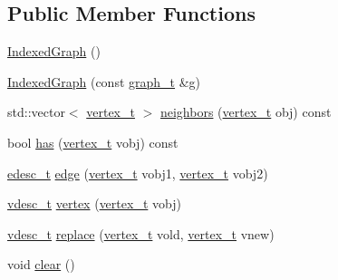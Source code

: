 \subsection*{Public Member Functions}
\begin{DoxyCompactItemize}
\item 
\hyperlink{class_wire_cell_1_1_indexed_graph_a010abbec94dc4a91d471fe6a3131370a}{Indexed\+Graph} ()
\item 
\hyperlink{class_wire_cell_1_1_indexed_graph_a0bee33ff275af7255d0e7dafcc10d950}{Indexed\+Graph} (const \hyperlink{class_wire_cell_1_1_indexed_graph_a5593f08e4be84de33ebf37de7d071819}{graph\+\_\+t} \&g)
\item 
std\+::vector$<$ \hyperlink{class_wire_cell_1_1_indexed_graph_ac26b25ac103373dde929a982d948d1b5}{vertex\+\_\+t} $>$ \hyperlink{class_wire_cell_1_1_indexed_graph_a172ae52877eb8727d2580e199b41cc64}{neighbors} (\hyperlink{class_wire_cell_1_1_indexed_graph_ac26b25ac103373dde929a982d948d1b5}{vertex\+\_\+t} obj) const
\item 
bool \hyperlink{class_wire_cell_1_1_indexed_graph_a77bec91576cb23b64ea200cd03a5d686}{has} (\hyperlink{class_wire_cell_1_1_indexed_graph_ac26b25ac103373dde929a982d948d1b5}{vertex\+\_\+t} vobj) const
\item 
\hyperlink{class_wire_cell_1_1_indexed_graph_a7dabdef2dec280294d6ead6f0fdc66c8}{edesc\+\_\+t} \hyperlink{class_wire_cell_1_1_indexed_graph_a03a0f192232d913bfb4171fc7b2e095a}{edge} (\hyperlink{class_wire_cell_1_1_indexed_graph_ac26b25ac103373dde929a982d948d1b5}{vertex\+\_\+t} vobj1, \hyperlink{class_wire_cell_1_1_indexed_graph_ac26b25ac103373dde929a982d948d1b5}{vertex\+\_\+t} vobj2)
\item 
\hyperlink{class_wire_cell_1_1_indexed_graph_a8bad4d4e6f2d8a8109e95757d502c9ba}{vdesc\+\_\+t} \hyperlink{class_wire_cell_1_1_indexed_graph_a80546c5d1dee591fae4c845de560f806}{vertex} (\hyperlink{class_wire_cell_1_1_indexed_graph_ac26b25ac103373dde929a982d948d1b5}{vertex\+\_\+t} vobj)
\item 
\hyperlink{class_wire_cell_1_1_indexed_graph_a8bad4d4e6f2d8a8109e95757d502c9ba}{vdesc\+\_\+t} \hyperlink{class_wire_cell_1_1_indexed_graph_a1c2b3474d425594b43dea46c975a27f4}{replace} (\hyperlink{class_wire_cell_1_1_indexed_graph_ac26b25ac103373dde929a982d948d1b5}{vertex\+\_\+t} vold, \hyperlink{class_wire_cell_1_1_indexed_graph_ac26b25ac103373dde929a982d948d1b5}{vertex\+\_\+t} vnew)
\item 
void \hyperlink{class_wire_cell_1_1_indexed_graph_adb8836f8e4ccae7a86b062a47dedb0a3}{clear} ()

\end{DoxyCompactItemize}
